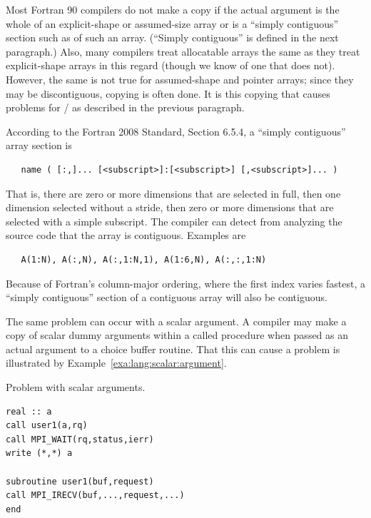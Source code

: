 \begin{itemize}
Most Fortran 90 compilers do not make a copy if the actual argument is
the whole of an explicit-shape or assumed-size array or is a ``simply contiguous''
section such as  of such an array.
(``Simply contiguous'' is defined in the next paragraph.)
Also, many compilers treat allocatable arrays
the same as they treat explicit-shape arrays in this regard (though we know of one that
does not). However, the same is not true for assumed-shape and pointer
arrays; since they may be discontiguous, copying is often done. It is
this copying that causes problems for \MPI/ as described in the previous
paragraph.

According to the Fortran 2008 Standard, Section 6.5.4, a ``simply contiguous'' array section is
\begin{verbatim}
   name ( [:,]... [<subscript>]:[<subscript>] [,<subscript>]... )
\end{verbatim}
That is, there are zero or more dimensions that are selected in full,
then one dimension selected without a stride, then zero or more
dimensions that are selected with a simple subscript.
The compiler can detect from analyzing the source code that the array is contiguous.
Examples are
\begin{verbatim}
   A(1:N), A(:,N), A(:,1:N,1), A(1:6,N), A(:,:,1:N)
\end{verbatim}
Because of Fortran's column-major ordering, where the first index
varies fastest, a ``simply contiguous'' section of a contiguous array will also be
contiguous.

The same problem can occur with a scalar argument.
A compiler may
make a copy of scalar dummy arguments within
a called procedure when passed as an actual argument to a choice buffer routine.
That this can cause a problem is illustrated by
Example~\ref{exa:lang:scalar:argument}.
\begin{example}
Problem with scalar arguments.
\label{exa:lang:scalar:argument}
%
%
\begin{lstlisting}[language={[MPI]Fortran}]
real :: a
call user1(a,rq)
call MPI_WAIT(rq,status,ierr)
write (*,*) a

subroutine user1(buf,request)
call MPI_IRECV(buf,...,request,...)
end
\end{lstlisting}
\end{example}


\end{itemize}
